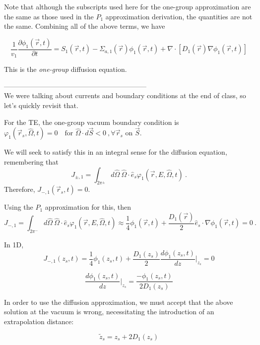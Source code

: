 \documentclass[12pt]{article}
\newcommand{\rvec}{\ensuremath{\vec{r}}}
\newcommand{\omvec}{\ensuremath{\hat{\Omega}}}
\begin{document}
Note that although the subscripts used here for the one-group approximation are the same as those used in
the $P_1$ approximation derivation, the quantities are not the same. Combining all of the above terms, we
have

\begin{equation*}
\frac{1}{v_1}\frac{\partial \phi_1(\rvec,t)}{\partial t} = S_1(\rvec,t) - 
\Sigma_{a,1}(\rvec)\phi_1(\rvec,t) + \nabla\cdot[D_1(\rvec)\nabla\phi_1(\rvec,t)]
\end{equation*}

This is the \emph{one-group} diffusion equation.

--------------------------------------------------------------\\
We were talking about currents and boundary conditions at the end of class, so let's quickly revisit that. 

For the TE, the one-group vacuum boundary condition is $\varphi_1 (\vec{r}_s, \omvec, t) = 0 \quad \text{for }\omvec \cdot d\vec{S} < 0\:, \forall \rvec_s \text{ on } \vec{S}$.

We will seek to satisfy this in an integral sense for the diffusion equation, remembering that
\begin{equation*}
J_{\pm,1} = \int_{2\pi^{\pm}}d\omvec\:\omvec\cdot\hat{e}_s\varphi_1(\rvec,E,\omvec,t)\:.
\end{equation*}
Therefore, $J_{-,1}(\rvec_s,t) = 0$.

Using the $P_1$ approximation for this, then
\[J_{-,1} = \int_{2\pi^{-}}d\omvec\:\omvec\cdot\hat{e}_s\varphi_1(\rvec,E,\omvec,t) \approx \frac{1}{4}\phi_1(\rvec, t) + \frac{D_1(\rvec)}{2}\hat{e}_s \cdot \nabla \phi_1(\rvec, t) = 0\:.\]


In 1D,
\begin{equation*}
J_{-,1}(z_s,t) = \frac{1}{4}\phi_1(z_s,t) + \frac{D_1(z_s)}{2}\frac{d\phi_1(z_s,t)}{dz}\Bigr|_{z_s} = 0
\end{equation*}

\begin{equation*}
\frac{d\phi_1(z_s,t)}{dz}\Bigr|_{z_s} = \frac{-\phi_1(z_s,t)}{2D_1(z_s)}
\end{equation*}

In order to use the diffusion approximation, we must accept that the above solution at the vacuum is wrong, necessitating the introduction of an extrapolation distance:

\begin{equation*}
\tilde{z}_s = z_s + 2D_1(z_s)
\end{equation*}
\end{document}
